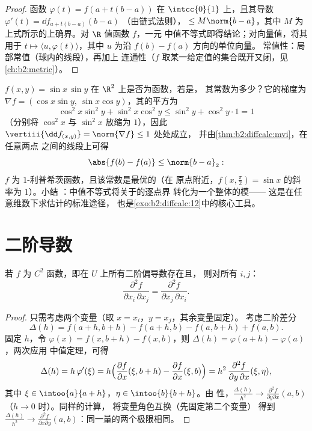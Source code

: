 \begin{proof}
函数 $\varphi(t) = f(a + t(b-a))$ 在
$\intcc{0}{1}$ 上，且其导数 $\varphi'(t) = \dd f_{a + t(b-a)}(b - a)$
（由链式法则）， $\leq M\norm{b-a}$，其中 $M$ 为
上式所示的上确界。对 $\R$ 值函数 $f$，一元
中值不等式即得结论；对向量值，将其用于 $t \mapsto \langle u,
\varphi(t)\rangle$，其中 $u$ 为沿 $f(b) - f(a)$ 方向的单位向量。
常值性：局部常值（球内的线段），再加上
连通性（$f$ 取某一给定值的集合既开又闭，见
\cref{ch:b2:metric}）。
\end{proof}

\begin{example}[由中值不等式得到的利普希茨常数]\label{ex:b2:diffcalc:lipschitz}
$f(x, y) = \sin x\,\sin y$ 在 $\R^2$ 上是否为函数，若是，
其常数为多少？它的梯度为 $\nabla f = (\cos x\sin y,\
\sin x\cos y)$，其的平方为
\[
\cos^2x\sin^2y + \sin^2x\cos^2y
\leq \sin^2 y + \cos^2y\cdot 1 = 1
\]
（分别将 $\cos^2x$ 与 $\sin^2x$ 放缩为 $1$），因此
$\vertiii{\dd f_{(x,y)}} = \norm{\nabla f} \leq 1$ 处处成立，
并由\cref{thm:b2:diffcalc:mvi}，在任意两点
之间的线段上可得
\[
\abs{f(b) - f(a)} \leq \norm{b - a}_2 :
\]
$f$ 为 $1$-利普希茨函数，且该常数是最优的（在
原点附近，$f(x, \tfrac\pi2) = \sin x$ 的斜率为 $1$）。小结
：中值不等式将关于的逐点界
转化为一个整体的模——
这是在任意维数下求估计的标准途径，
也是\cref{exo:b2:diffcalc:12}中的核心工具。
\end{example}

\section{二阶导数}

\begin{theorem}[施瓦茨]\label{thm:b2:diffcalc:schwarz}
若 $f$ 为 $C^2$ 函数，即在 $U$ 上所有二阶偏导数存在且，
则对所有 $i, j$：\index{施瓦茨定理}
\[
\frac{\partial^2 f}{\partial x_i\,\partial x_j}
= \frac{\partial^2 f}{\partial x_j\,\partial x_i} .
\]
\end{theorem}

\begin{proof}
只需考虑两个变量（取 $x = x_i$，$y = x_j$，其余变量固定）。
考虑二阶差分
\[
\Delta(h) = f(a + h, b + h) - f(a + h, b) - f(a, b + h) + f(a,b) .
\]
固定 $h$，令 $\varphi(x) = f(x, b+h) - f(x, b)$，则 $\Delta(h)
= \varphi(a + h) - \varphi(a)$，两次应用
中值定理，可得
\[
\Delta(h) = h\,\varphi'(\xi)
= h\Bigl(\frac{\partial f}{\partial x}(\xi, b+h) -
\frac{\partial f}{\partial x}(\xi, b)\Bigr)
= h^2\,\frac{\partial^2 f}{\partial y\,\partial x}(\xi, \eta),
\]
其中 $\xi \in \intoo{a}{a+h}$，$\eta \in \intoo{b}{b+h}$。由
性，$\frac{\Delta(h)}{h^2} \to \frac{\partial^2 f}{\partial
y\partial x}(a, b)$（$h \to 0$ 时）。同样的计算，
将变量角色互换（先固定第二个变量）
得到 $\frac{\Delta(h)}{h^2} \to \frac{\partial^2 f}{\partial x
\partial y}(a,b)$：同一量的两个极限相同。
\end{proof}

